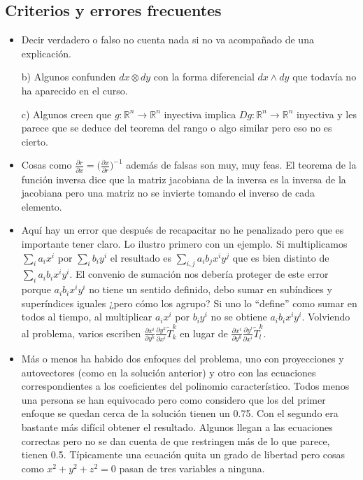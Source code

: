 \subsection{Criterios y errores frecuentes}
\begin{itemize}
	\item Decir verdadero o falso no cuenta nada si no va acompañado de una explicación. 
	
	
	b) Algunos confunden $dx\otimes dy$ con la forma diferencial $dx\wedge dy$ que todavía no ha aparecido en el curso. 
	
	c) Algunos creen que $g:ℝ^n\longrightarrow ℝ^n$ inyectiva implica $Dg:ℝ^n\longrightarrow ℝ^n$ inyectiva y les parece que se deduce del teorema del rango o algo similar pero eso no es cierto.
	\item Cosas como $\frac{\partial r}{\partial x}=\big(\frac{\partial x}{\partial r}\big)^{-1}$ además de falsas son muy, muy feas.  El teorema de la función inversa dice que la matriz jacobiana de la inversa es la inversa de la jacobiana pero una matriz no se invierte tomando el inverso de cada elemento. 
	\item Aquí hay un error que después de recapacitar no he penalizado pero que es importante tener claro. Lo ilustro primero con un ejemplo. Si multiplicamos  $\sum_i a_i x^i$ por $\sum_i b_i y^i$ el resultado es  $\sum_{i,j} a_ib_j x^iy^j$ que es bien distinto de $\sum_{i} a_ib_i x^iy^i$. El convenio de sumación nos debería proteger de este error porque $a_ib_i x^iy^i$ no tiene un sentido definido, debo sumar en subíndices y superíndices iguales ¿pero cómo los agrupo? Si uno lo ``define'' como sumar en todos al tiempo, al multiplicar $a_ix^i$ por $b_iy^i$ no se obtiene $a_ib_i x^iy^i$. Volviendo al problema, varios escriben 
	$\frac{\partial x^i}{\partial y^k}
	\frac{\partial y^k}{\partial x^i}
	\widetilde{T}^k_k$
	en lugar de 
	$\frac{\partial x^i}{\partial y^k}
	\frac{\partial y^l}{\partial x^i}
	\widetilde{T}^k_l$. 
	\item Más o menos ha habido dos enfoques del problema, uno con proyecciones y autovectores (como en la solución anterior) y otro con las ecuaciones correspondientes a los coeficientes del polinomio característico. Todos menos una persona se han equivocado pero como considero que los del primer enfoque se quedan cerca de la solución  tienen un 0.75. Con el segundo era bastante más difícil obtener el resultado. Algunos llegan a las ecuaciones correctas pero no se dan cuenta de que restringen más de lo que parece, tienen 0.5. Típicamente una ecuación quita un grado de libertad pero cosas como $x^2+y^2+z^2=0$ pasan de tres variables a ninguna. 
\end{itemize}
